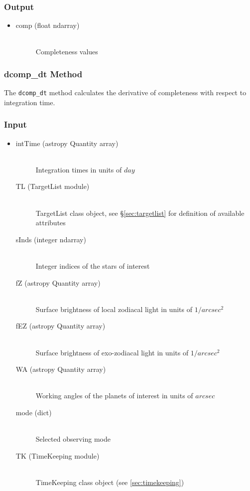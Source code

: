 \documentclass[cleanfoot]{asme2ej}
\begin{document}
\subsubsection*{Output}
\begin{itemize}
\item 
\begin{description}
    \item[comp (float ndarray)] \hfill \\
        Completeness values
\end{description}
\end{itemize}

\subsubsection{dcomp\_dt Method}
\label{sec:dcompdt}
The \verb+dcomp_dt+ method calculates the derivative of completeness with respect to integration time.
\subsubsection*{Input}
\begin{itemize}
\item 
\begin{description}
    \item[intTime (astropy Quantity array)] \hfill \\ Integration times in units of $ day $
    \item[TL (TargetList module)] \hfill \\ TargetList class object, see \S\ref{sec:targetlist} for definition of available attributes
    \item[sInds (integer ndarray)] \hfill \\ Integer indices of the stars of interest
    \item[fZ (astropy Quantity array)] \hfill \\ Surface brightness of local zodiacal light in units of $ 1/arcsec^2 $
    \item[fEZ (astropy Quantity array)] \hfill \\ Surface brightness of exo-zodiacal light in units of $ 1/arcsec^2 $
    \item[WA (astropy Quantity array)] \hfill \\ Working angles of the planets of interest in units of $ arcsec $
    \item[mode (dict)] \hfill \\ Selected observing mode
    \item[TK (TimeKeeping module)] \hfill \\ TimeKeeping class object (see \ref{sec:timekeeping})
\end{description}
\end{itemize}
\end{document}
